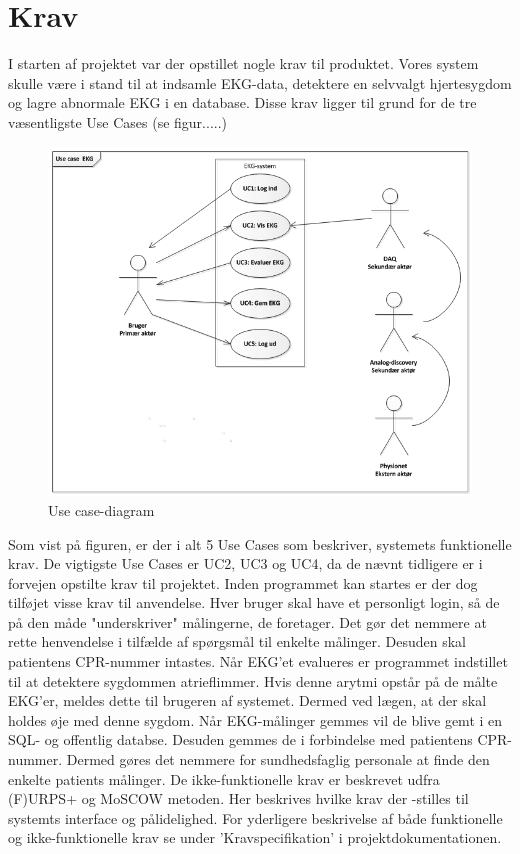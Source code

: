 \chapter{Krav}
I starten af projektet var der opstillet nogle krav til produktet. Vores system skulle være i stand til at indsamle EKG-data, detektere en selvvalgt hjertesygdom og lagre abnormale EKG i en database. Disse krav ligger til grund for de tre væsentligste Use Cases (se figur.....)

\begin{figure}[htb]
	\centering
	\includegraphics[width=1\textwidth]{Figurer/Snip20150518_11}
	\caption{Use case-diagram}
	\label{fig:Use Cases}
\end{figure}

Som vist på figuren, er der i alt 5 Use Cases som beskriver, systemets funktionelle krav. De vigtigste Use Cases er UC2, UC3 og UC4, da de nævnt tidligere er i forvejen opstilte krav til projektet. Inden programmet kan startes er der dog tilføjet visse krav til anvendelse. Hver bruger skal have et personligt login, så de på den måde "underskriver" målingerne, de foretager. Det gør det nemmere at rette henvendelse i tilfælde af spørgsmål til enkelte målinger. Desuden skal patientens CPR-nummer intastes.
Når EKG'et evalueres er programmet indstillet til at detektere sygdommen atrieflimmer. Hvis denne arytmi opstår på de målte EKG'er, meldes dette til brugeren af systemet. Dermed ved lægen, at der skal holdes øje med denne sygdom.
Når EKG-målinger gemmes vil de blive gemt i en SQL- og offentlig databse. Desuden gemmes de i forbindelse med patientens CPR-nummer. Dermed gøres det nemmere for sundhedsfaglig personale at finde den enkelte patients målinger.
De ikke-funktionelle krav er beskrevet udfra (F)URPS+ og MoSCOW metoden. Her beskrives hvilke krav der -stilles til systemts interface og pålidelighed.
For yderligere beskrivelse af både funktionelle og ikke-funktionelle krav se under 'Kravspecifikation' i projektdokumentationen. 